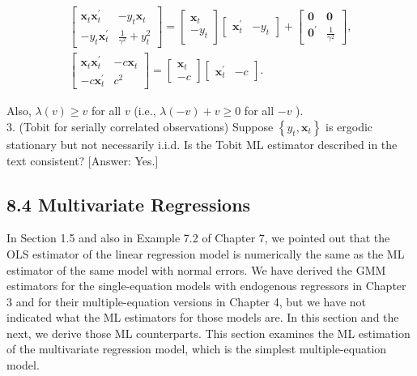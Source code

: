 \documentclass[10pt]{article}
\begin{document}
$$
\begin{gathered}
{\left[\begin{array}{cc}
\mathbf{x}_{t} \mathbf{x}_{t}^{\prime} & -y_{t} \mathbf{x}_{t} \\
-y_{t} \mathbf{x}_{t}^{\prime} & \frac{1}{\gamma^{2}}+y_{t}^{2}
\end{array}\right]=\left[\begin{array}{c}
\mathbf{x}_{t} \\
-y_{t}
\end{array}\right]\left[\begin{array}{ll}
\mathbf{x}_{t}^{\prime} & -y_{t}
\end{array}\right]+\left[\begin{array}{cc}
\mathbf{0} & \mathbf{0} \\
\mathbf{0}^{\prime} & \frac{1}{\gamma^{2}}
\end{array}\right],} \\
{\left[\begin{array}{cc}
\mathbf{x}_{t} \mathbf{x}_{t}^{\prime} & -c \mathbf{x}_{t} \\
-c \mathbf{x}_{t}^{\prime} & c^{2}
\end{array}\right]=\left[\begin{array}{c}
\mathbf{x}_{t} \\
-c
\end{array}\right]\left[\begin{array}{ll}
\mathbf{x}_{t}^{\prime} & -c
\end{array}\right] .}
\end{gathered}
$$

Also, $\lambda(v) \geq v$ for all $v$ (i.e., $\lambda(-v)+v \geq 0$ for all $-v$ ).\\
3. (Tobit for serially correlated observations) Suppose $\left\{y_{t}, \mathbf{x}_{t}\right\}$ is ergodic stationary but not necessarily i.i.d. Is the Tobit ML estimator described in the text consistent? [Answer: Yes.]

\subsection*{8.4 Multivariate Regressions}
In Section 1.5 and also in Example 7.2 of Chapter 7, we pointed out that the OLS estimator of the linear regression model is numerically the same as the ML estimator of the same model with normal errors. We have derived the GMM estimators for the single-equation models with endogenous regressors in Chapter 3 and for their multiple-equation versions in Chapter 4, but we have not indicated what the ML estimators for those models are. In this section and the next, we derive those ML counterparts. This section examines the ML estimation of the multivariate regression model, which is the simplest multiple-equation model.
\end{document}
